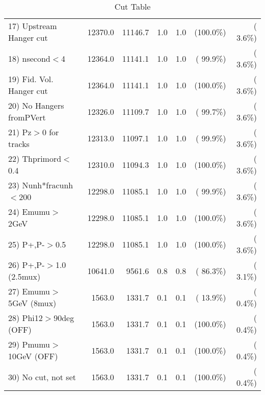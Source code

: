 \begin{table}[h!]
\begin{tabular}{||l||r|r|r|r|r|r||}
 17) Upstream Hanger cut  &      12370.0 &      11146.7 &          1.0 &          1.0 & (100.0\%) & (  3.6\%) \\
 18) nsecond$<$4          &      12364.0 &      11141.1 &          1.0 &          1.0 & ( 99.9\%) & (  3.6\%) \\
 19) Fid. Vol. Hanger cut &      12364.0 &      11141.1 &          1.0 &          1.0 & (100.0\%) & (  3.6\%) \\
 20) No Hangers fromPVert &      12326.0 &      11109.7 &          1.0 &          1.0 & ( 99.7\%) & (  3.6\%) \\
 21) Pz$>$0 for tracks    &      12313.0 &      11097.1 &          1.0 &          1.0 & ( 99.9\%) & (  3.6\%) \\
 22) Thprimord$<$0.4      &      12310.0 &      11094.3 &          1.0 &          1.0 & (100.0\%) & (  3.6\%) \\
 23) Nunh*fracunh$<$200   &      12298.0 &      11085.1 &          1.0 &          1.0 & ( 99.9\%) & (  3.6\%) \\
 24) Emumu$>$2GeV         &      12298.0 &      11085.1 &          1.0 &          1.0 & (100.0\%) & (  3.6\%) \\
 25) P+,P-$>$0.5          &      12298.0 &      11085.1 &          1.0 &          1.0 & (100.0\%) & (  3.6\%) \\
 26) P+,P-$>$1.0 (2.5mux) &      10641.0 &       9561.6 &          0.8 &          0.8 & ( 86.3\%) & (  3.1\%) \\
 27) Emumu$>$5GeV  (8mux) &       1563.0 &       1331.7 &          0.1 &          0.1 & ( 13.9\%) & (  0.4\%) \\
 28) Phi12$>$90deg  (OFF) &       1563.0 &       1331.7 &          0.1 &          0.1 & (100.0\%) & (  0.4\%) \\
 29) Pmumu$>$10GeV  (OFF) &       1563.0 &       1331.7 &          0.1 &          0.1 & (100.0\%) & (  0.4\%) \\
 30) No cut, not set      &       1563.0 &       1331.7 &          0.1 &          0.1 & (100.0\%) & (  0.4\%) \\
 \hline
 \hline
 \end{tabular}
 \caption{Cut Table           }
 \label{tab-cutcohjpsi-mumu_jpsi}
 \end{table}
